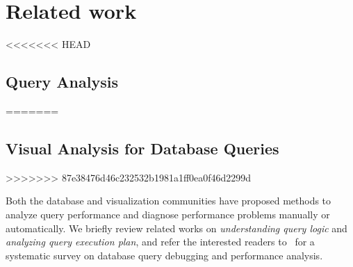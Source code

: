 \section{Related work}
<<<<<<< HEAD
\subsection{Query Analysis}
=======
\subsection{Visual Analysis for Database Queries}
>>>>>>> 87e38476d46c232532b1981a1ff0ea0f46d2299d



Both the database and visualization communities have proposed methods to analyze query performance and diagnose performance problems manually or automatically. We briefly review related works on \textit{understanding query logic} and \textit{analyzing query execution plan}, and refer the interested readers to~\cite{gathani2020debugging} for a systematic survey on database query debugging and performance analysis.



